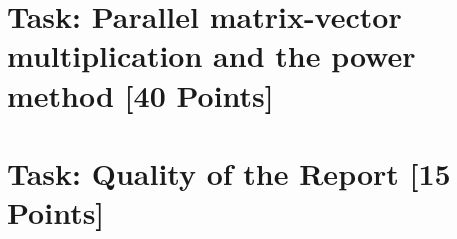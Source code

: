 \documentclass[unicode,11pt,a4paper,oneside,numbers=endperiod,openany]{scrartcl}
\begin{document}
\section{Task: Parallel matrix-vector multiplication and the power method [40 Points]}



\section{Task:  Quality of the Report [15 Points]}
\end{document}
